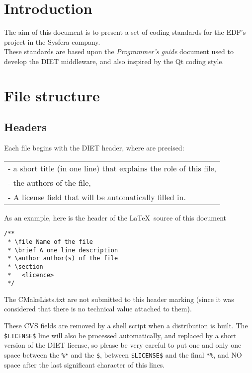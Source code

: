 \documentclass{article}
\begin{document}
\section*{Introduction}
The aim of this document is to present a set of coding standards for the EDF's
 project in the Sysfera company.\\
These standards are based upon the \textit{Programmer's guide} document used
 to develop the DIET middleware, and also inspired by the Qt coding style.

\section{File structure}

\subsection{Headers}

Each file begins with the DIET header, where are precised:\\
\begin{tabular}{l}
- a short title (in one line)  that explains the role of this file,\\
- the authors of the file,\\
- A license field that will be automatically filled in.\\
\end{tabular}

As an example, here is the header of the \LaTeX\ source of this document
\begin{verbatim}
/**
 * \file Name of the file
 * \brief A one line description
 * \author author(s) of the file
 * \section
 *   <licence>
 */
\end{verbatim}

The CMakeLists.txt are not submitted to this header marking (since it was
considered that there is no technical value attached to them).


These CVS fields are removed by a shell script when a distribution is built. The
\texttt{\$LICENSE\$} line will also be processed automatically, and replaced by
a short version of the DIET license, so please be very careful to put one and
only one space between the \texttt{\%*} and the \texttt{\$}, between 
\texttt{\$LICENSE\$} and the final \texttt{*\%}, and NO space after the last
significant character of this lines.
\end{document}
